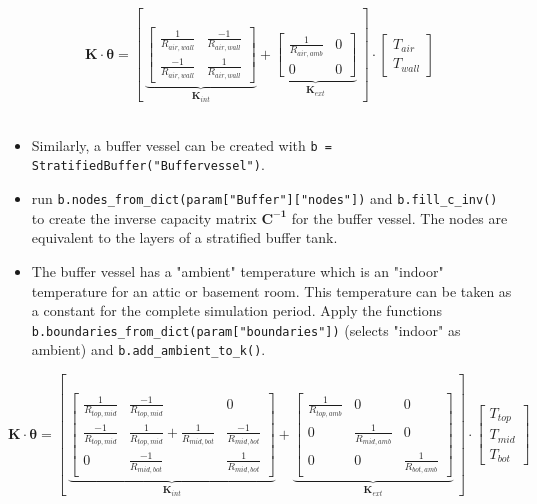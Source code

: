 	\begin{equation}
		\mathbf{K} \cdot \boldsymbol{\theta} =
		\left[~
		\underbrace{
		\begin{bmatrix}
			\frac{1}{R_{air, wall}} & \frac{-1}{R_{air, wall}} \\
			\frac{-1}{R_{air, wall}} &  \frac{1}{R_{air, wall}}
		\end{bmatrix}
	    }_{\mathbf{K}_{int}}
	    +
	    \underbrace{
	    \begin{bmatrix}
	    	\frac{1}{R_{air, amb}} & 0 \\
	    	0 &  0
	    \end{bmatrix}
        }_{\mathbf{K}_{ext}}
        ~\right]
		\cdot
		\begin{bmatrix}
			T_{air} \\
			T_{wall}
		\end{bmatrix}
	\end{equation}
\\
\begin{itemize}
	\item Similarly, a buffer vessel can be created with \texttt{b = StratifiedBuffer("Buffervessel")}.
	\item run \texttt{b.nodes\_from\_dict(param["Buffer"]["nodes"])} and \texttt{b.fill\_c\_inv()} to create the inverse capacity matrix $\mathbf{C^{-1}}$ for the buffer vessel. The nodes are equivalent to the layers of a stratified buffer tank.
	\item The buffer vessel has a "ambient" temperature which is an "indoor" temperature for an attic or basement room. This temperature can be taken as a constant for the complete simulation period. Apply the functions \texttt{b.boundaries\_from\_dict(param["boundaries"])} (selects "indoor" as ambient) and 
	\texttt{b.add\_ambient\_to\_k()}.
\end{itemize}

\begin{equation}
	\mathbf{K} \cdot \boldsymbol{\theta} =
	\left[~
    \underbrace{
	\begin{bmatrix}
		\frac{1}{R_{top, mid}}  & \frac{-1}{R_{top, mid}} & 0\\
		\frac{-1}{R_{top, mid}} &  \frac{1}{R_{top, mid}} + \frac{1}{R_{mid, bot}} & \frac{-1}{R_{mid, bot}}\\
		0  &  \frac{-1}{R_{mid, bot}} & \frac{1}{R_{mid, bot}}
	\end{bmatrix}
	}_{\mathbf{K}_{int}}
	+
	\underbrace{
	\begin{bmatrix}
		\frac{1}{R_{top, amb}} & 0 & 0 \\
	    0 & \frac{1}{R_{mid, amb}} & 0  \\
	    0 & 0 & \frac{1}{R_{bot, amb}} 
	\end{bmatrix}
    }_{\mathbf{K}_{ext}}
	~\right]
	\cdot
	\begin{bmatrix}
		T_{top} \\
		T_{mid}  \\
		T_{bot} 
	\end{bmatrix}
\end{equation}
\\

